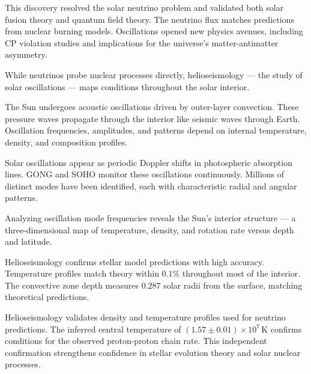 This discovery resolved the solar neutrino problem and validated both solar fusion theory and quantum field theory. The neutrino flux matches predictions from nuclear burning models. Oscillations opened new physics avenues, including CP violation studies and implications for the universe's matter-antimatter asymmetry.

While neutrinos probe nuclear processes directly, helioseismology — the study of solar oscillations — maps conditions throughout the solar interior.

The Sun undergoes acoustic oscillations driven by outer-layer convection. These pressure waves propagate through the interior like seismic waves through Earth. Oscillation frequencies, amplitudes, and patterns depend on internal temperature, density, and composition profiles.

Solar oscillations appear as periodic Doppler shifts in photospheric absorption lines. GONG and SOHO monitor these oscillations continuously. Millions of distinct modes have been identified, each with characteristic radial and angular patterns.

Analyzing oscillation mode frequencies reveals the Sun's interior structure — a three-dimensional map of temperature, density, and rotation rate versus depth and latitude.

Helioseismology confirms stellar model predictions with high accuracy. Temperature profiles match theory within $0.1\%$ throughout most of the interior. The convective zone depth measures $0.287$ solar radii from the surface, matching theoretical predictions.

Helioseismology validates density and temperature profiles used for neutrino predictions. The inferred central temperature of $(1.57 \pm 0.01) \times 10^7\,\text{K}$ confirms conditions for the observed proton-proton chain rate. This independent confirmation strengthens confidence in stellar evolution theory and solar nuclear processes.